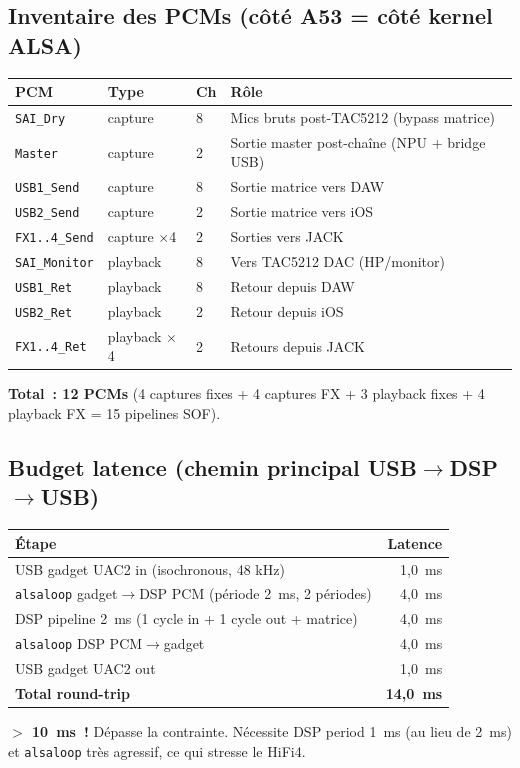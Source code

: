 \documentclass[11pt,a4paper]{article}
\begin{document}
\subsection{Inventaire des PCMs (côté A53 = côté kernel ALSA)}
\begin{center}
\begin{tabularx}{\textwidth}{lllX}
\toprule
\textbf{PCM} & \textbf{Type} & \textbf{Ch} & \textbf{Rôle} \\
\midrule
\texttt{SAI\_Dry} & capture & 8 & Mics bruts post-TAC5212 (bypass matrice) \\
\texttt{Master} & capture & 2 & Sortie master post-chaîne (NPU + bridge USB) \\
\texttt{USB1\_Send} & capture & 8 & Sortie matrice vers DAW \\
\texttt{USB2\_Send} & capture & 2 & Sortie matrice vers iOS \\
\texttt{FX1..4\_Send} & capture $\times$4 & 2 & Sorties vers JACK \\
\texttt{SAI\_Monitor} & playback & 8 & Vers TAC5212 DAC (HP/monitor) \\
\texttt{USB1\_Ret} & playback & 8 & Retour depuis DAW \\
\texttt{USB2\_Ret} & playback & 2 & Retour depuis iOS \\
\texttt{FX1..4\_Ret} & playback $\times$4 & 2 & Retours depuis JACK \\
\bottomrule
\end{tabularx}
\end{center}
\textbf{Total~: 12 PCMs} (4 captures fixes + 4 captures FX + 3 playback fixes + 4 playback FX = 15 pipelines SOF).

\subsection{Budget latence (chemin principal USB$\rightarrow$DSP$\rightarrow$USB)}
\begin{center}
\begin{tabular}{lr}
\toprule
\textbf{Étape} & \textbf{Latence} \\
\midrule
USB gadget UAC2 in (isochronous, 48 kHz) & 1{,}0~ms \\
\texttt{alsaloop} gadget$\rightarrow$DSP PCM (période 2~ms, 2 périodes) & 4{,}0~ms \\
DSP pipeline 2~ms (1 cycle in + 1 cycle out + matrice) & 4{,}0~ms \\
\texttt{alsaloop} DSP PCM$\rightarrow$gadget & 4{,}0~ms \\
USB gadget UAC2 out & 1{,}0~ms \\
\midrule
\textbf{Total round-trip} & \textbf{14{,}0~ms} \\
\bottomrule
\end{tabular}
\end{center}
\textcolor{red!70!black}{\textbf{$>$ 10~ms~!}} Dépasse la contrainte. Nécessite DSP period 1~ms (au lieu de 2~ms) et \texttt{alsaloop} très agressif, ce qui stresse le HiFi4.
\end{document}
